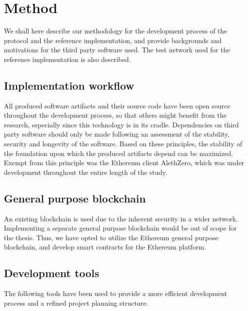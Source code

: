 \chapter{Method}
We shall here describe our methodology for the development process of the protocol and the reference implementation, and provide backgrounds and motivations for the third party software used. The test network used for the reference implementation is also described.

\section{Implementation workflow}
All produced software artifacts and their source code have been open source throughout the development process, so that others might benefit from the research, especially since this technology is in its cradle. Dependencies on third party software should only be made following an assessment of the stability, security and longevity of the software. Based on these principles, the stability of the foundation upon which the produced artifacts depend can be maximized. Exempt from this principle was the Ethereum client AlethZero, which was under development throughout the entire length of the study. 

\section{General purpose blockchain}
An existing blockchain is used due to the inherent security in a wider network. Implementing a separate general purpose blockchain would be out of scope for the thesis. Thus, we have opted to utilize the Ethereum general purpose blockchain, and develop smart contracts for the Ethereum platform.

\section{Development tools}
The following tools have been used to provide a more efficient development process and a refined project planning structure.


